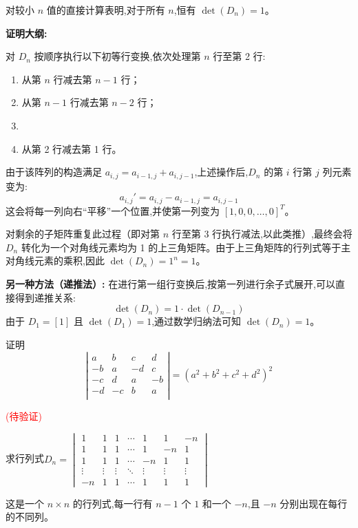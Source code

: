 \begin{questions}
\begin{solution}
对较小 $n$ 值的直接计算表明,对于所有 $n$,恒有 $\det(D_n) = 1$。

\textbf{证明大纲:}

对 $D_n$ 按顺序执行以下初等行变换,依次处理第 $n$ 行至第 2 行:
\begin{enumerate}
    \item 从第 $n$ 行减去第 $n-1$ 行；
    \item 从第 $n-1$ 行减去第 $n-2$ 行；
    \item[\dots]
    \item[$(n-1).$] 从第 2 行减去第 1 行。
\end{enumerate}

由于该阵列的构造满足 $a_{i,j} = a_{i-1,j} + a_{i,j-1}$,上述操作后,$D_n$ 的第 $i$ 行第 $j$ 列元素变为:
\[
a_{i,j}' = a_{i,j} - a_{i-1,j} = a_{i,j-1}
\]
这会将每一列向右“平移”一个位置,并使第一列变为 $[1, 0, 0, \dots, 0]^T$。

对剩余的子矩阵重复此过程（即对第 $n$ 行至第 3 行执行减法,以此类推）,最终会将 $D_n$ 转化为一个对角线元素均为 1 的上三角矩阵。由于上三角矩阵的行列式等于主对角线元素的乘积,因此 $\det(D_n) = 1^n = 1$。

\textbf{另一种方法（递推法）:}
在进行第一组行变换后,按第一列进行余子式展开,可以直接得到递推关系:
\[
\det(D_n) = 1 \cdot \det(D_{n-1})
\]
由于 $D_1 = [1]$ 且 $\det(D_1) = 1$,通过数学归纳法可知 $\det(D_n) = 1$。
\end{solution}

\question 证明
    \[
    \left|
    \begin{matrix}
    a & b & c & d \\
    -b & a & -d & c \\
    -c & d & a & -b \\
    -d & -c & b & a \\
    \end{matrix}
    \right|
    =
    \left(a^2 + b^2 + c^2 + d^2\right)^2
    \]  
\begin{solution}
    \textcolor{red}{(待验证)}
\end{solution}  

\question 求行列式$D_n = 
    \begin{vmatrix}
    1 & 1 & 1 & \cdots & 1 & 1 & -n \\
    1 & 1 & 1 & \cdots & 1 & -n & 1 \\
    1 & 1 & 1 & \cdots & -n & 1 & 1 \\
    \vdots & \vdots & \vdots & \ddots & \vdots & \vdots & \vdots \\
    -n & 1 & 1 & \cdots & 1 & 1 & 1
    \end{vmatrix}$
    \begin{solution}
    这是一个 $n\times n$ 的行列式,每一行有 $n{-}1$ 个 $1$ 和一个 $-n$,且 $-n$ 分别出现在每行的不同列。
    

\end{solution}
\end{questions}
